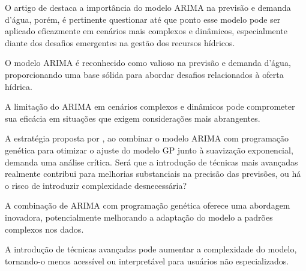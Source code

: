 %
%
%

O artigo de  destaca a importância do modelo ARIMA na previsão e demanda d'água, porém, é pertinente questionar até que ponto esse modelo pode ser aplicado eficazmente em cenários mais complexos e dinâmicos, especialmente diante dos desafios emergentes na gestão dos recursos hídricos.

O modelo ARIMA é reconhecido como valioso na previsão e demanda d'água, proporcionando uma base sólida para abordar desafios relacionados à oferta hídrica.

A limitação do ARIMA em cenários complexos e dinâmicos pode comprometer sua eficácia em situações que exigem considerações mais abrangentes.

A estratégia proposta por , ao combinar o modelo ARIMA com programação genética para otimizar o ajuste do modelo GP junto à suavização exponencial, demanda uma análise crítica. Será que a introdução de técnicas mais avançadas realmente contribui para melhorias substanciais na precisão das previsões, ou há o risco de introduzir complexidade desnecessária?

A combinação de ARIMA com programação genética oferece uma abordagem inovadora, potencialmente melhorando a adaptação do modelo a padrões complexos nos dados.

A introdução de técnicas avançadas pode aumentar a complexidade do modelo, tornando-o menos acessível ou interpretável para usuários não especializados.

